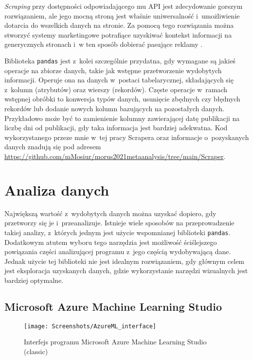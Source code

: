 \emph{Scraping} przy dostępności odpowiadającego mu API jest zdecydowanie gorszym rozwiązaniem, ale jego mocną stroną jest właśnie uniwersalność i~umożliwienie dotarcia do wszelkich danych na stronie.
Za pomocą tego rozwiązania można stworzyć systemy marketingowe potrafiące uzyskiwać kontekst informacji na generycznych stronach i~w ten sposób dobierać pasujące reklamy \cite{vargiu2013exploiting}.

Biblioteka \texttt{pandas} jest z~kolei szczególnie przydatna, gdy wymagane są jakieś operacje na zbiorze danych, takie jak wstępne przetworzenie wydobytych informacji.
Operuje ona na danych w~postaci tabelarycznej, składających się z~kolumn (atrybutów) oraz wierszy (rekordów).
Częste operacje w~ramach wstępnej obróbki to konwersja typów danych, usunięcie zbędnych czy błędnych rekordów lub dodanie nowych kolumn bazujących na pozostałych danych.
Przykładowo może być to zamienienie kolumny zawierającej datę publikacji na liczbę dni od publikacji, gdy taka informacja jest bardziej adekwatna.
Kod wykorzystanego przeze mnie w~tej pracy Scrapera oraz informacje o~pozyskanych danych znadują się pod adresem \url{https://github.com/mMosiur/morus2021metaanalysis/tree/main/Scraper}.

\section{Analiza danych}

Największą wartość z~wydobytych danych można uzyskać dopiero, gdy przetworzy się je i~przeanalizuje.
Istnieje wiele sposobów na przeprowadzenie takiej analizy, z~których jednym jest użycie wspomnianej biblioteki \texttt{pandas}.
Dodatkowym atutem wyboru tego narzędzia jest możliwość ściślejszego powiązania części analizującej programu z~jego częścią wydobywającą dane.
Jednak użycie tej biblioteki nie jest idealnym rozwiązaniem, gdy głównym celem jest eksploracja uzyskanych danych, gdzie wykorzystanie narzędzi wizualnych jest bardziej optymalne.

\subsection{Microsoft Azure Machine Learning Studio}

\begin{figure}[ht]
	\texttt{[image: Screenshots/AzureML\_interface]}
	\caption{Interfejs programu Microsoft Azure Machine Learning Studio (classic)}
	\label{fig:interface}
\end{figure}

